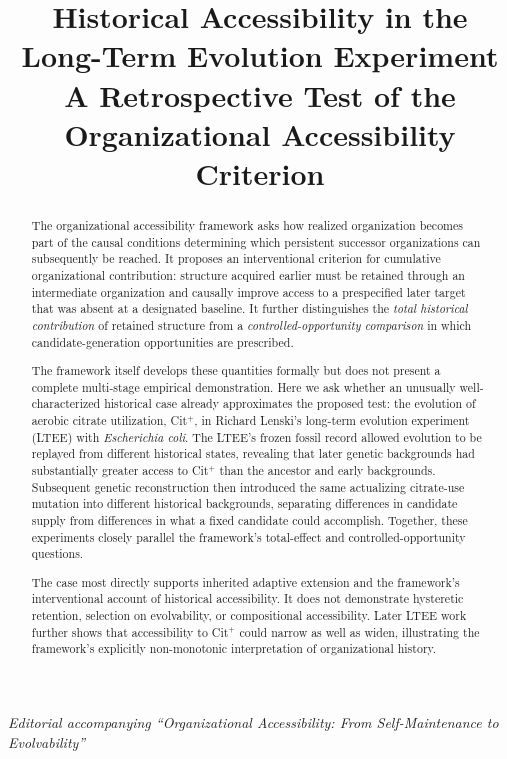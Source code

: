 \documentclass[11pt]{article}
\title{\textbf{Historical Accessibility in the Long-Term Evolution Experiment}\\[0.4em]
\large A Retrospective Test of the Organizational Accessibility Criterion}
\author{}
\date{}
\begin{document}
\maketitle

\begin{center}
\emph{Editorial accompanying ``Organizational Accessibility: From Self-Maintenance to Evolvability''}
\end{center}

\begin{abstract}
The organizational accessibility framework asks how realized organization becomes part of the causal conditions determining which persistent successor organizations can subsequently be reached. It proposes an interventional criterion for cumulative organizational contribution: structure acquired earlier must be retained through an intermediate organization and causally improve access to a prespecified later target that was absent at a designated baseline. It further distinguishes the \emph{total historical contribution} of retained structure from a \emph{controlled-opportunity comparison} in which candidate-generation opportunities are prescribed.

The framework itself develops these quantities formally but does not present a complete multi-stage empirical demonstration. Here we ask whether an unusually well-characterized historical case already approximates the proposed test: the evolution of aerobic citrate utilization, Cit$^{+}$, in Richard Lenski's long-term evolution experiment (LTEE) with \emph{Escherichia coli}. The LTEE's frozen fossil record allowed evolution to be replayed from different historical states, revealing that later genetic backgrounds had substantially greater access to Cit$^{+}$ than the ancestor and early backgrounds. Subsequent genetic reconstruction then introduced the same actualizing citrate-use mutation into different historical backgrounds, separating differences in candidate supply from differences in what a fixed candidate could accomplish. Together, these experiments closely parallel the framework's total-effect and controlled-opportunity questions.

The case most directly supports inherited adaptive extension and the framework's interventional account of historical accessibility. It does not demonstrate hysteretic retention, selection on evolvability, or compositional accessibility. Later LTEE work further shows that accessibility to Cit$^{+}$ could narrow as well as widen, illustrating the framework's explicitly non-monotonic interpretation of organizational history.
\end{abstract}
\end{document}
